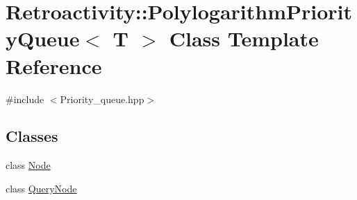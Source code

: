 \hypertarget{classRetroactivity_1_1PolylogarithmPriorityQueue}{}\section{Retroactivity\+:\+:Polylogarithm\+Priority\+Queue$<$ T $>$ Class Template Reference}
\label{classRetroactivity_1_1PolylogarithmPriorityQueue}


{\ttfamily \#include $<$Priority\+\_\+queue.\+hpp$>$}

\subsection*{Classes}
\begin{DoxyCompactItemize}
\item 
class \hyperlink{classRetroactivity_1_1PolylogarithmPriorityQueue_1_1Node}{Node}
\item 
class \hyperlink{classRetroactivity_1_1PolylogarithmPriorityQueue_1_1QueryNode}{Query\+Node}
\end{DoxyCompactItemize}
